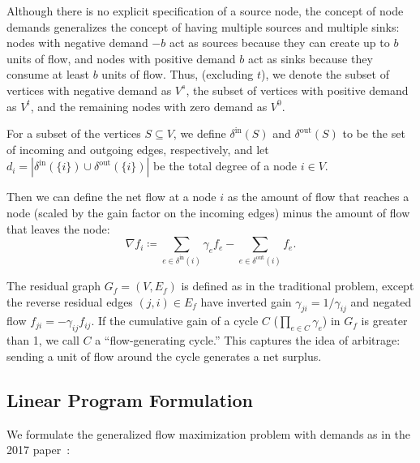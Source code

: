 \documentclass[11pt]{article}
\theoremstyle{definition}
\theoremstyle{definition}
\newcommand{\nfi}{\nabla f_i}
\newcommand{\din}{\delta^{\text{in}}}
\newcommand{\dout}{\delta^{\text{out}}}
\newcommand{\vsrc}{V^{s}}
\newcommand{\vsink}{V^{t}}
\newcommand{\vz}{V^{0}}
\newcommand{\rewrite}[1]{\textcolor{red}{#1}}
\begin{document}
	Although there is no explicit specification of a source node, the concept of
	node demands generalizes the concept of having multiple sources and multiple
	sinks: nodes with negative demand $-b$ act as sources because they can create
	up to $b$ units of flow, and nodes with positive demand $b$ act as sinks 
	because they consume at least $b$ units of flow. Thus, (excluding $t$), we denote the subset of
	vertices with negative demand as $\vsrc$, the subset of vertices with positive
	demand as $\vsink$, and the remaining nodes with zero demand as $\vz$.

	For a subset of the vertices $S \subseteq V$, we define $\din(S)$ and
	$\dout(S)$ to be the set of incoming and outgoing edges, respectively,
	and let $d_i = |\din(\{i\}) \cup \dout(\{i\})|$ be the total degree of a
	node $i \in V$.

	Then we can define the net flow at a node $i$ as the amount of flow that
	reaches a node (scaled by the gain factor on the incoming edges) minus the
	amount of flow that leaves the node: 
	$$ \nfi \coloneqq \sum_{e \in \din(i)} \gamma_e f_e - \sum_{e \in \dout(i)} f_e.$$

	The residual graph $G_f = (V,E_f)$ is defined as in the traditional problem,
	except the reverse residual edges $(j,i) \in E_f$ have inverted gain 
	$\gamma_{ji} = 1 / \gamma_{ij}$ and negated flow $f_{ji} =
	-\gamma_{ij}f_{ij}$. If the cumulative gain of a cycle $C$ ($\prod_{e \in C} \gamma_e$)
	in $G_f$ is greater than 1, we call $C$ a ``flow-generating cycle.'' 
	This captures the idea of arbitrage: sending a unit of flow around the cycle
	generates a net surplus.





	\subsection{Linear Program Formulation}
	\label{sec:lp}

	We formulate the generalized flow maximization problem with demands as in the 2017
	paper~\cite{Olver2017}:
	\vspace{-0.35cm}
%
%
\end{document}
